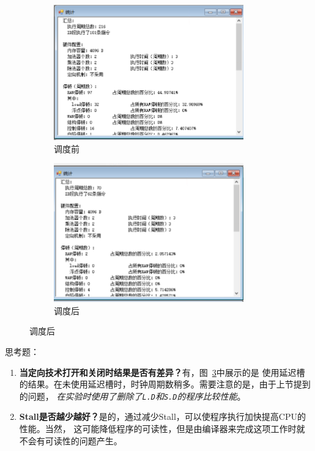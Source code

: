 \documentclass[a4paper,twoside]{article}
\begin{document}
\begin{spacing}{1.2}
\begin{figure}[htb]
	\centering
	\begin{subfigure}[b]{0.4\textwidth}
		\centering
		\includegraphics[width=0.9\textwidth]{images/unrollbefore.png}
		\caption{调度前}
		\label{fig:beforeunroll}
	\end{subfigure}
	\begin{subfigure}[b]{0.4\textwidth}
		\centering
		\includegraphics[width=0.9\textwidth]{images/unrollafter.png}
		\caption{调度后}
		\label{fig:afterunroll}
	\end{subfigure}
\end{figure}

思考题：
\begin{enumerate}
	\item \textbf{当定向技术打开和关闭时结果是否有差异？}有，图~\ref{fig:afterunroll}中展示的是
	使用延迟槽的结果。在未使用延迟槽时，时钟周期数稍多。需要注意的是，由于上节提到的问题，
	\emph{在实验时使用了删除了\texttt{L.D}和\texttt{S.D}的程序比较性能}。
	\item \textbf{Stall是否越少越好？}是的，通过减少Stall，可以使程序执行加快提高CPU的性能。当然，
	这可能降低程序的可读性，但是由编译器来完成这项工作时就不会有可读性的问题产生。
\end{enumerate}



\end{spacing}
\end{document}
